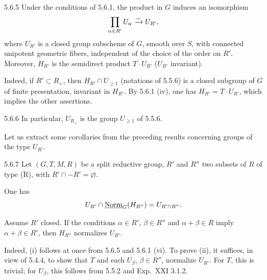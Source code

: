 \begin{corollary}{5.6.5}\label{XXII.5.6.5}
Under the conditions of 5.6.1, the product in $G$ induces an isomorphism
\[
\prod_{\alpha\in R'}U_\alpha\xrightarrow{\sim} U_{R'},
\]
where $U_{R'}$ is a closed group subscheme of $G$, smooth over $S$, with connected unipotent geometric fibers, independent of the choice of the order on $R'$. Moreover, $H_{R'}$ is the semidirect product $T\cdot U_{R'}$ ($U_{R'}$ invariant).
\end{corollary}
Indeed, if $R'\subset R_+$, then $H_{R'}\cap U_{\ge1}$ (notations of 5.5.6) is a closed subgroup of $G$ of finite presentation, invariant in $H_{R'}$. By 5.6.1 (iv), one has $H_{R'}=T\cdot U_{R'}$, which implies the other assertions.
\begin{remark}{5.6.6}\label{XXII.5.6.6}
In particular, $U_{R_+}$ is the group $U_{\ge1}$ of 5.5.6.
\end{remark}
Let us extract some corollaries from the preceding results concerning groups of the type $U_{R'}$.
\begin{corollary}{5.6.7}\label{XXII.5.6.7}
Let $(G,T,M,R)$ be a split reductive group, $R'$ and $R''$ two subsets of $R$ of type (R), with $R'\cap-R'=\varnothing$.
\begin{enumeratei}
\item One has
\[
U_{R'}\cap\underline{\mathrm{Norm}}_G(H_{R''})=U_{R'\cap R''}.
\]
\item Assume $R'$ closed. If the conditions $\alpha\in R'$, $\beta\in R''$ and $\alpha+\beta\in R$ imply $\alpha+\beta\in R'$, then $H_{R''}$ normalizes $U_{R'}$.
\end{enumeratei}
\end{corollary}
Indeed, (i) follows at once from 5.6.5 and 5.6.1 (vi). To prove (ii), it suffices, in view of 5.4.4, to show that $T$ and each $U_\beta$, $\beta\in R''$, normalize $U_{R'}$.{\renewcommand{\thefootnote}{(42)}} For $T$, this is trivial; for $U_\beta$, this follows from 5.5.2 and Exp.~XXI 3.1.2.{\renewcommand{\thefootnote}{(43)}}
